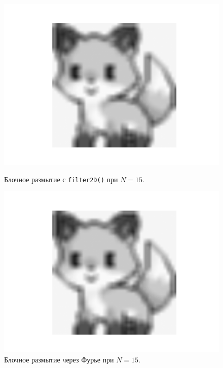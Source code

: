 \documentclass[a4paper]{article}
\begin{document}
\begin{figure}[H]
  \centering
  \begin{minipage}{0.49\textwidth}
    \centering
    \includegraphics[width=\textwidth]{src/box_15.png}
    \caption{Блочное размытие с \texttt{filter2D()} при $N=15$.}
  \end{minipage}
  \begin{minipage}{0.49\textwidth}
    \centering
    \includegraphics[width=\textwidth]{src/ifft_box_15.png}
    \caption{Блочное размытие через Фурье при $N=15$.}
  \end{minipage}
\end{figure}
\end{document}
